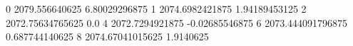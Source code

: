 0 2079.556640625 6.80029296875
1 2074.6982421875 1.94189453125
2 2072.75634765625 0.0
4 2072.7294921875 -0.02685546875
6 2073.444091796875 0.687744140625
8 2074.67041015625 1.9140625
